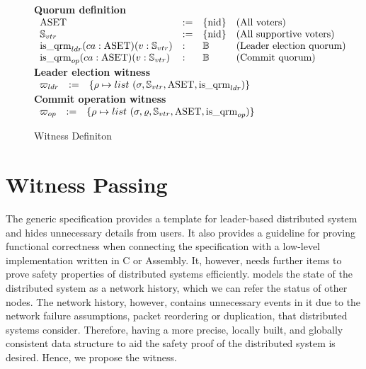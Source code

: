 \begin{figure}
{\small
\raggedright
\textbf{Quorum definition}  \\
	\vspace{0.05in}
$
\begin{array}{llll}
\mathrm{ASET} & := & \{\mathrm{nid}\} & \mbox{(All voters)}\\
\mathbb{S}_{vtr} & := & \{\mathrm{nid}\} & \mbox{(All supportive voters)}\\
\mathrm{is}\_\mathrm{qrm}_{ldr} (ca: \mathrm{ASET}) (v: \mathbb{S}_{vtr}) &:& \mathbb{B} & \mbox{(Leader election quorum)} \\
\mathrm{is}\_\mathrm{qrm}_{op} (ca: \mathrm{ASET}) (v: \mathbb{S}_{vtr})  &:&  \mathbb{B} &  \mbox{(Commit quorum)}\\
\end{array}
$
\\
	\vspace{0.05in}
\textbf{Leader election witness}  \\
	\vspace{0.05in}
$
\begin{array}{llll}
{\varpi_{ldr}} &:=&  \{\rho \mapsto list\ (\sigma, \mathbb{S}_{vtr}, \mathrm{ASET}, \mathrm{is}\_\mathrm{qrm}_{ldr})\} & \\
\end{array}
$
\\
	\vspace{0.05in}
\textbf{Commit operation witness}  \\
	\vspace{0.05in}
$
\begin{array}{llll}
{\varpi_{op}} &:=& \{\rho \mapsto list\ (\sigma, \varrho, \mathbb{S}_{vtr},
	\mathrm{ASET}, \mathrm{is}\_\mathrm{qrm}_{op})\}& 
\end{array}
$
\\
} %
\vspace{-1em}
\caption{Witness Definiton}
\label{fig:witness-definition}
\vspace{-1.5em}
\end{figure}

\vspace{-0.5em}

\section{Witness Passing}
\label{sec:witness-passing}

The generic specification provides a template for leader-based distributed
system and hides unnecessary details from users. It also provides a guideline 
for proving functional correctness when connecting the specification with a 
low-level implementation written in C or Assembly.
It, however, needs further items to prove safety properties of distributed 
systems efficiently.  
\sysname{} models the state of the distributed system as a network history, 
which we can refer the status of other nodes.
The network history, however, contains unnecessary events in it due to
the network failure assumptions, packet reordering or duplication, that  
distributed systems consider. Therefore, having a more precise, 
locally built, and globally consistent data structure to aid the safety proof 
of the distributed system is desired. Hence, we propose the witness.   

